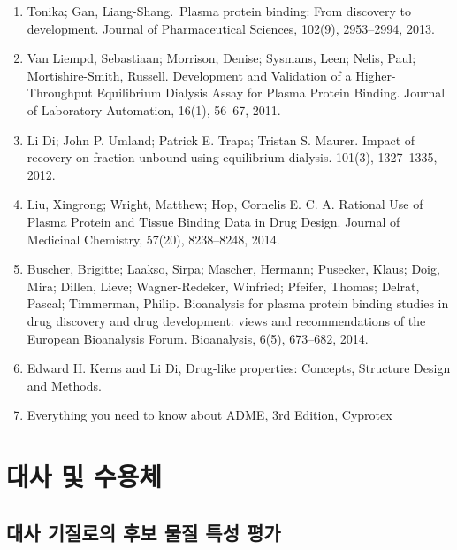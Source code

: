 \documentclass[
  11pt,
  krantz2, a4paper, twoside]{krantz}
\providecommand{\tightlist}{%
  \setlength{\itemsep}{0pt}\setlength{\parskip}{0pt}}
\begin{document}
\begin{enumerate}
\def\labelenumi{\arabic{enumi}.}
\tightlist
\item
  Tonika; Gan, Liang-Shang.~Plasma protein binding: From discovery to development. Journal of Pharmaceutical Sciences, 102(9), 2953--2994, 2013.
\item
  Van Liempd, Sebastiaan; Morrison, Denise; Sysmans, Leen; Nelis, Paul; Mortishire-Smith, Russell. Development and Validation of a Higher-Throughput Equilibrium Dialysis Assay for Plasma Protein Binding. Journal of Laboratory Automation, 16(1), 56--67, 2011.
\item
  Li Di; John P. Umland; Patrick E. Trapa; Tristan S. Maurer. Impact of recovery on fraction unbound using equilibrium dialysis. 101(3), 1327--1335, 2012.
\item
  Liu, Xingrong; Wright, Matthew; Hop, Cornelis E. C. A. Rational Use of Plasma Protein and Tissue Binding Data in Drug Design. Journal of Medicinal Chemistry, 57(20), 8238--8248, 2014.
\item
  Buscher, Brigitte; Laakso, Sirpa; Mascher, Hermann; Pusecker, Klaus; Doig, Mira; Dillen, Lieve; Wagner-Redeker, Winfried; Pfeifer, Thomas; Delrat, Pascal; Timmerman, Philip. Bioanalysis for plasma protein binding studies in drug discovery and drug development: views and recommendations of the European Bioanalysis Forum. Bioanalysis, 6(5), 673--682, 2014.
\item
  Edward H. Kerns and Li Di, Drug-like properties: Concepts, Structure Design and Methods.
\item
  Everything you need to know about ADME, 3rd Edition, Cyprotex
\end{enumerate}

\hypertarget{part-uxb300uxc0ac-uxbc0f-uxc218uxc6a9uxccb4}{%
\part{대사 및 수용체}\label{part-uxb300uxc0ac-uxbc0f-uxc218uxc6a9uxccb4}}

\hypertarget{uxb300uxc0ac-uxae30uxc9c8uxb85cuxc758-uxd6c4uxbcf4-uxbb3cuxc9c8-uxd2b9uxc131-uxd3c9uxac00}{%
\chapter{대사 기질로의 후보 물질 특성 평가}\label{uxb300uxc0ac-uxae30uxc9c8uxb85cuxc758-uxd6c4uxbcf4-uxbb3cuxc9c8-uxd2b9uxc131-uxd3c9uxac00}}

\Large\hfill
\end{document}
